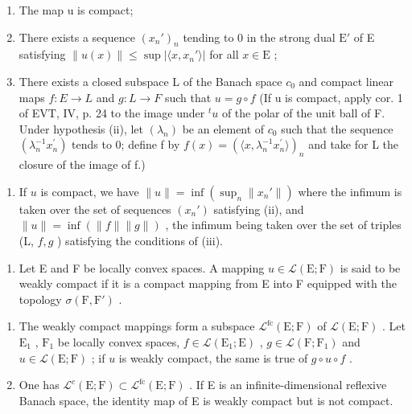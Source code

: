 \begin{enumerate}
\def\labelenumi{(\roman{enumi})}
\item
  The map u is compact;
\item
  There exists a sequence \((x_n')_n\) tending to 0 in the strong dual \(\mathrm{E}'\) of E satisfying \(\| u(x)\| \leqslant \sup |\langle x,x_n' \rangle|\) for all \(x \in \mathrm{E}\) ;
\item
  There exists a closed subspace L of the Banach space \(c_{0}\) and compact linear maps \(f: E \to L\) and \(g: L \to F\) such that \(u = g \circ f\) (If u is compact, apply cor. 1 of EVT, IV, p. 24 to the image under \(^{t}u\) of the polar of the unit ball of F. Under hypothesis (ii), let \((\lambda_{n})\) be an element of \(c_{0}\) such that the sequence \((\lambda_{n}^{-1}x_{n}^{\prime})\) tends to 0; define f by \(f(x) = (\langle x, \lambda_{n}^{-1}x_{n}^{\prime} \rangle)_{n}\) and take for L the closure of the image of f.)
\end{enumerate}

\begin{enumerate}
\def\labelenumi{\alph{enumi})}
\setcounter{enumi}{1}
\tightlist
\item
  If \(u\) is compact, we have \(\|u\| = \inf(\sup_n \|x_n'\|)\) where the infimum is taken over the set of sequences \((x_n')\) satisfying (ii), and \(\|u\| = \inf(\|f\|\|g\|)\) , the infimum being taken over the set of triples (L, \(f,g\) ) satisfying the conditions of (iii).
\end{enumerate}

\begin{enumerate}
\def\labelenumi{\arabic{enumi})}
\setcounter{enumi}{26}
\tightlist
\item
  Let E and F be locally convex spaces. A mapping \(u \in \mathcal{L}(\mathrm{E};\mathrm{F})\) is said to be weakly compact if it is a compact mapping from E into F equipped with the topology \(\sigma(\mathrm{F},\mathrm{F}')\) .
\end{enumerate}

\begin{enumerate}
\def\labelenumi{\alph{enumi})}
\item
  The weakly compact mappings form a subspace \(\mathcal{L}^{\mathrm{fc}}(\mathrm{E};\mathrm{F})\) of \(\mathcal{L}(\mathrm{E};\mathrm{F})\) . Let \(\mathrm{E}_1\) , \(\mathrm{F}_1\) be locally convex spaces, \(f\in \mathcal{L}(\mathrm{E}_1;\mathrm{E})\) , \(g\in \mathcal{L}(\mathrm{F};\mathrm{F}_1)\) and \(u\in \mathcal{L}(\mathrm{E};\mathrm{F})\) ; if \(u\) is weakly compact, the same is true of \(g\circ u\circ f\) .
\item
  One has \(\mathcal{L}^{c}(\mathrm{E};\mathrm{F})\subset\mathcal{L}^{\mathrm{fc}}(\mathrm{E};\mathrm{F})\) . If E is an infinite-dimensional reflexive Banach space, the identity map of E is weakly compact but is not compact.
\end{enumerate}

